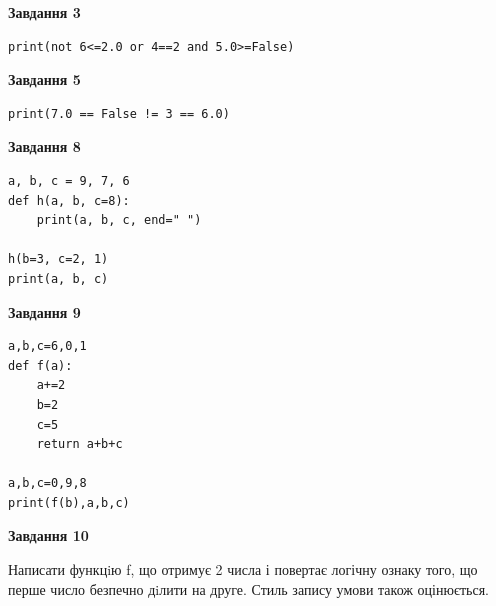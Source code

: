\documentclass[12pt, ukrainian]{article}
\begin{document}
{\begin {large}
\begin{minipage}[t]{7.5cm}
\end{minipage}
\vline \hspace{6mm}
\begin{minipage}[t]{10.5cm}

\begin{center}
\textbf{Завдання 3}
\end{center}

\begin{verbatim}
print(not 6<=2.0 or 4==2 and 5.0>=False)
\end{verbatim}



\begin{center}
\textbf{Завдання 5}
\end{center}

\begin{verbatim}
print(7.0 == False != 3 == 6.0)
\end{verbatim}



\begin{center}
\textbf{Завдання 8}
\end{center}

\begin{verbatim}
a, b, c = 9, 7, 6
def h(a, b, c=8):
    print(a, b, c, end=" ")

h(b=3, c=2, 1)
print(a, b, c)
\end{verbatim}



\begin{center}
\textbf{Завдання 9}
\end{center}

\begin{verbatim}
a,b,c=6,0,1
def f(a):
    a+=2
    b=2
    c=5
    return a+b+c

a,b,c=0,9,8
print(f(b),a,b,c)
\end{verbatim}



\begin{center}
\textbf{Завдання 10}
\end{center}

Написати функцiю f, що отримує 2 числа і повертає логічну ознаку того, що перше число безпечно дiлити на друге. Стиль запису умови також оцінюється.\par

\end{minipage}

\end {large}}
\newpage
\end{document}
